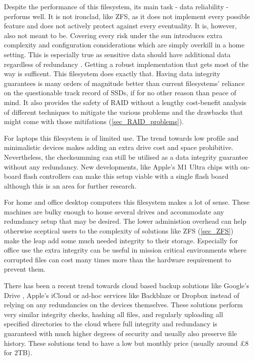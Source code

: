         Despite the performance of this filesystem, its main task - data
        reliability - performs well. It is not ironclad, like ZFS, as it does
        not implement every possible feature and does not actively protect
        against every eventuality. It is, however, also not meant to be.
        Covering every risk under the sun introduces extra complexity and
        configuration considerations which are simply overkill in a home
        setting. This is especially true as sensitive data should have
        additional data regardless of redundancy \cite{Backblaze_321}. Getting
        a robust implementation that gets most of the way is sufficent. This
        filesystem does exactly that. Having data integrity guarantees is many
        orders of magnitude better than current filesystems' reliance on the
        questionable track record of SSDs, if for no other reason than peace of
        mind. It also provides the safety of RAID without a lengthy
        cost-benefit analysis of different techniques to mitigate the various
        problems and the drawbacks that might come with those mitifations
        (\ref{sec_RAID_problems}).

        For laptops this filesystem is of limited use. The trend towards low
        profile and minimalistic devices makes adding an extra drive cost and
        space prohibitive. Nevertheless, the checksumming can still be utilised
        as a data integrity guarantee without any redundancy. New developments,
        like Apple's M1 Ultra chips with on-board flash controllers
        \cite{m1_ultra_controller} can make this setup viable with a single
        flash board although this is an area for further research.

        For home and office desktop computers this filesystem makes a lot of
        sense. These machines are bulky enough to house several drives and
        accommodate any redundancy setup that may be desired. The lower
        administion overhead can help otherwise sceptical users to the
        complexity of solutions like ZFS (\ref{sec_ZFS}) make the leap add some
        much needed integrity to their storage. Especially for office use the
        extra integrity can be useful in mission critical environments where
        corrupted files can cost many times more than the hardware requirement
        to prevent them.

        There has been a recent trend towards cloud based backup solutions like
        Google's Drive \cite{gdrive}, Apple's iCloud \cite{icloud} or ad-hoc
        services like Backblaze \cite{Backblaze_321} or Dropbox \cite{dropbox}
        instead of relying on any redundancies on the devices themselves. These
        solutions perform very similar integrity checks, hashing all files, and
        regularly uploading all specified directories to the cloud where full
        integrity and redundancy is guaranteed \cite{Backblaze_arch} with much
        higher degrees of security and usually also preserve file history.
        These solutions tend to have a low but monthly price (usually around
        £8 for 2TB).


